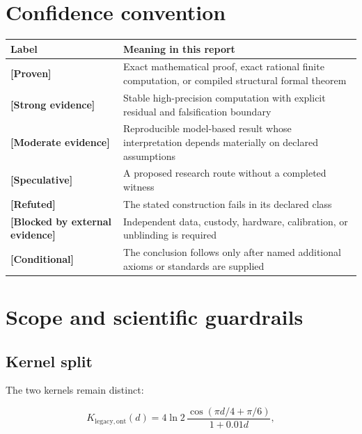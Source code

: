 \documentclass[11pt,a4paper,openany]{report}
\newcommand{\statusProven}{\textcolor{fingreen}{[Proven]}}
\newcommand{\statusStrong}{\textcolor{finblue}{[Strong evidence]}}
\newcommand{\statusModerate}{\textcolor{finviolet}{[Moderate evidence]}}
\newcommand{\statusSpeculative}{\textcolor{finorange}{[Speculative]}}
\newcommand{\statusRefuted}{\textcolor{finred}{[Refuted]}}
\begin{document}
\tableofcontents
\clearpage
{}

\chapter*{Confidence convention}

\begin{center}
\begingroup\small
\setlength{\tabcolsep}{2.5pt}
\renewcommand{\arraystretch}{1.16}
\begin{longtable}{@{}p{}p{}@{}}
\toprule
\textbf{Label} & \textbf{Meaning in this report} \\
\midrule
\endhead
\textbf{\statusProven{}} & Exact mathematical proof, exact rational finite computation, or compiled structural formal theorem \\
\textbf{\statusStrong{}} & Stable high-precision computation with explicit residual and falsification boundary \\
\textbf{\statusModerate{}} & Reproducible model-based result whose interpretation depends materially on declared assumptions \\
\textbf{\statusSpeculative{}} & A proposed research route without a completed witness \\
\textbf{\statusRefuted{}} & The stated construction fails in its declared class \\
\textbf{[Blocked by external evidence]} & Independent data, custody, hardware, calibration, or unblinding is required \\
\textbf{[Conditional]} & The conclusion follows only after named additional axioms or standards are supplied \\
\bottomrule
\end{longtable}
\endgroup
\end{center}

\chapter{Scope and scientific guardrails}

\section{Kernel split}

The two kernels remain distinct:

\[
K_{\mathrm{legacy,ont}}(d)=
4\ln2\,
\frac{\cos(\pi d/4+\pi/6)}{1+0.01d},
\]
\end{document}
